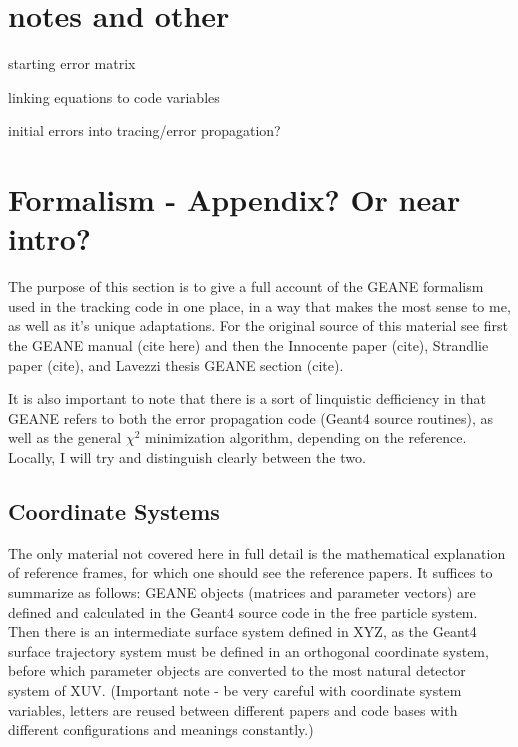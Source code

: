 \documentclass{article}
\begin{document}
\section{notes and other}

  starting error matrix

  linking equations to code variables

  initial errors into tracing/error propagation?


\section{Formalism - Appendix? Or near intro?}


The purpose of this section is to give a full account of the GEANE formalism used in the tracking code in one place, in a way that makes the most sense to me, as well as it's unique adaptations. For the original source of this material see first the GEANE manual (cite here) and then the Innocente paper (cite), Strandlie paper (cite), and Lavezzi thesis GEANE section (cite). 

It is also important to note that there is a sort of linquistic defficiency in that GEANE refers to both the error propagation code (Geant4 source routines), as well as the general $\chi^{2}$ minimization algorithm, depending on the reference. Locally, I will try and distinguish clearly between the two.


\subsection{Coordinate Systems}

The only material not covered here in full detail is the mathematical explanation of reference frames, for which one should see the reference papers. It suffices to summarize as follows: GEANE objects (matrices and parameter vectors) are defined and calculated in the Geant4 source code in the free particle system. Then there is an intermediate surface system defined in XYZ, as the Geant4 surface trajectory system must be defined in an orthogonal coordinate system, before which parameter objects are converted to the most natural detector system of XUV. (Important note - be very careful with coordinate system variables, letters are reused between different papers and code bases with different configurations and meanings constantly.)
\end{document}

